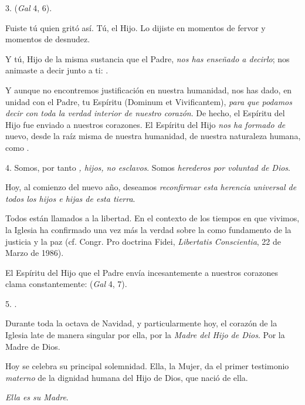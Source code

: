 \begin{body}
	3.  (\emph{Gal} 4, 6).
	
	Fuiste tú quien gritó así. Tú, el Hijo. Lo dijiste en momentos de fervor y momentos de desnudez.
	
	Y tú, Hijo de la misma sustancia que el Padre, \emph{nos has enseñado a 	decirlo}; nos animaste a decir junto a ti: .
	
	Y aunque no encontremos justificación en nuestra humanidad, nos has dado, en unidad con el Padre, tu Espíritu  (Dominum et Vivificantem), \emph{para que podamos decir  	con toda la verdad interior de nuestro corazón}. De hecho, el Espíritu del Hijo fue enviado a nuestros corazones. El Espíritu del Hijo \emph{nos ha formado de} nuevo, desde la raíz misma de nuestra humanidad, de nuestra naturaleza humana, como .
	
	4. Somos, por tanto \emph{, hijos, no esclavos}. Somos \emph{herederos 	por voluntad de Dios}.
	
	Hoy, al comienzo del nuevo año, deseamos \emph{reconfirmar esta herencia 	universal de todos los hijos e hijas de esta tierra}.
	
	Todos están llamados a la libertad. En el contexto de los tiempos en que vivimos, la Iglesia ha confirmado una vez más la verdad sobre la  como fundamento de la justicia y la paz (cf. Congr. Pro doctrina Fidei, \emph{Libertatis Conscientia}, 22 de Marzo de 1986).
	
	El Espíritu del Hijo que el Padre envía incesantemente a nuestros corazones clama constantemente:  (\emph{Gal} 4, 7).
	
	5. .
	
	Durante toda la octava de Navidad, y particularmente hoy, el corazón de la Iglesia late de manera singular por ella, por la \emph{Madre del Hijo 	de Dios}. Por la Madre de Dios.
	
	Hoy se celebra su principal solemnidad. Ella, la Mujer, da el primer testimonio \emph{materno} de la dignidad humana del Hijo de Dios, que nació de ella.
	
	\emph{Ella es su Madre}.
	

\end{body}
